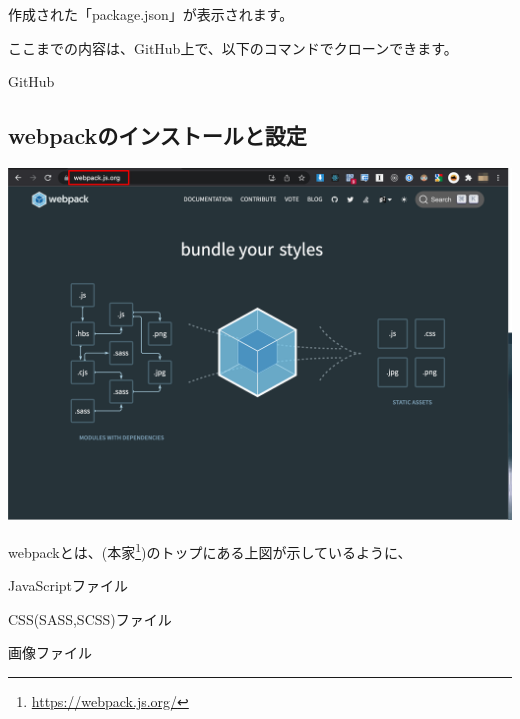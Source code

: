 作成された「package.json」が表示されます。

\begin{starternote}[]{}

ここまでの内容は、GitHub上で、以下のコマンドでクローンできます。

\def\startercodeblockfontsize{}
\begin{starterterminal}[]{GitHub}\end{starterterminal}
\end{starternote}

\subsection{webpackのインストールと設定}
\keeplastskip{
  \label{sec:2-2-2}
  \label{sec-04-webpack}
  \par\nobreak
}
\begin{reviewimage}%
\includegraphics[width=1.0\maxwidth]{./images/02-create-react-app/02_webpack_site.png}%
\label{image:02-create-react-app:02_webpack_site}
\end{reviewimage}

webpackとは、(本家\footnote{\url{https://webpack.js.org/}})のトップにある上図が示しているように、

\begin{starteritemize}
\item JavaScriptファイル
\item CSS(SASS,SCSS)ファイル
\item 画像ファイル
\end{starteritemize}

